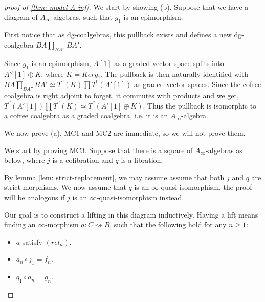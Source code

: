 \documentclass[../thesis.tex]{subfiles}
\begin{document}
        \begin{proof}[proof of \ref{thm: model-A-inf}]
            We start by showing (b). Suppose that we have a diagram of $A_\infty$-algebras, such that $g_1$ is an epimorphism.
            \begin{center}
            \end{center}
            First notice that as dg-coalgebras, this pullback exists and defines a new dg-coalgebra $BA \prod_{BA''}BA'$.

            Since $g_1$ is an epimorphism, $A[1]$ as a graded vector space splits into $A''[1] \oplus K$, where $K = Kerg_1$. The pullback is then naturally identified with $BA \prod_{BA''}BA' \simeq \overline{T}^c(K)\prod \overline{T}^c(A'[1])$ as graded vector spaces. Since the cofree coalgebra is right adjoint to forget, it commutes with products and we get, $\overline{T}^c(A'[1])\prod \overline{T}^c(K) \simeq \overline{T}^c(A'[1]\oplus K)$. Thus the pullback is isomorphic to a cofree coalgebra as a graded coalgebra, i.e. it is an $A_\infty$-algebra.

            We now prove (a). MC1 and MC2 are immediate, so we will not prove them.

            We start by proving MC3. Suppose that there is a square of $A_\infty$-algebras as below, where $j$ is a cofibration and $q$ is a fibration.
            \begin{center}
            \end{center}

            By lemma \ref{lem: strict-replacement}, we may assume assume that both $j$ and $q$ are strict morphisms. We now assume that $q$ is an $\infty$-quasi-isomorphism, the proof will be analogous if $j$ is an $\infty$-quasi-isomorphism instead.

            Our goal is to construct a lifting in this diagram inductively. Having a lift means finding an $\infty$-morphism $a : C \rightsquigarrow B$, such that the following hold for any $n\geq 1$:
            \begin{itemize}
                \item $a$ satisfy $(rel_n)$.
                \item $a_n \circ j_1 = f_n$.
                \item $q_1\circ a_n = g_n$.
            \end{itemize}


\end{proof}
\end{document}
